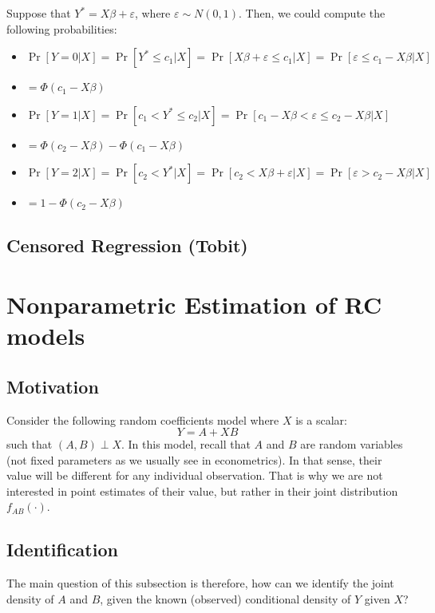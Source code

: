 \documentclass[12pt]{report}
\newcommand{\Prob}[1]{\operatorname{Pr}\left[#1\right]}
\begin{document}
Suppose that $Y^* = X\beta + \varepsilon$, where $\varepsilon\sim N(0,1)$. Then, we could compute the following probabilities:\begin{itemize}
\item $\Prob{Y = 0\vert X} = \Prob{Y^* \leq c_1\vert X} = \Prob{X\beta + \varepsilon \leq c_1\vert X} = \Prob{ \varepsilon \leq c_1 - X\beta \vert X} $
\item[] $ = \Phi(c_1 - X\beta)$
\item $\Prob{Y = 1\vert X} = \Prob{c_1 < Y^* \leq c_2\vert X} = \Prob{ c_1 - X\beta < \varepsilon \leq c_2 - X\beta \vert X} $
\item[] $ = \Phi(c_2 - X\beta) - \Phi(c_1 - X\beta)$
\item $\Prob{Y = 2\vert X} = \Prob{c_2 < Y^* \vert X} = \Prob{c_2 < X\beta + \varepsilon \vert X} = \Prob{ \varepsilon > c_2 - X\beta \vert X} $
\item[] $ = 1 - \Phi(c_2 - X\beta)$
\end{itemize}

\subsection{Censored Regression (Tobit)}



\section{Nonparametric Estimation of RC models}

\subsection{Motivation}

Consider the following random coefficients model where $X$ is a scalar: $$Y = A + XB $$ such that $(A, B)\perp X$. In this model, recall that $A$ and $B$ are random variables (not fixed parameters as we usually see in econometrics). In that sense, their value will be different for any individual observation. That is why we are not interested in point estimates of their value, but rather in their joint distribution $f_{AB}(\cdot)$.

\subsection{Identification}

The main question of this subsection is therefore, how can we identify the joint density of $A$ and $B$, given the known (observed) conditional density of $Y$ given $X$?
\end{document}
